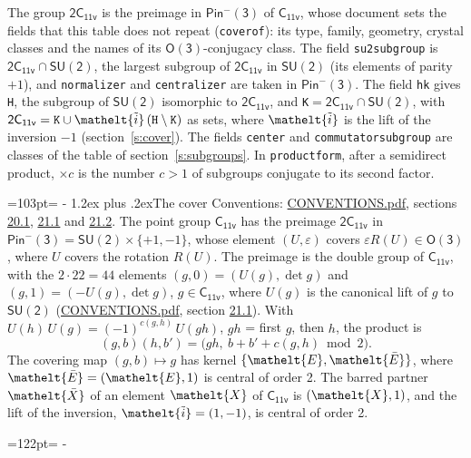 \documentclass[10pt,a4paper]{article}
\makeatletter
\renewcommand\section{\@startsection{section}{1}{\z@}{-3ex plus -1ex minus -.2ex}%
  {1.2ex plus .2ex}{\normalfont\large\sffamily\bfseries\color{parttitle}}}
\newcommand{\needspace}[1]{\par\penalty-100\begingroup\dimen0=#1\relax\dimen2=\pagegoal
  \advance\dimen2-\pagetotal\ifdim\dimen0>\dimen2\relax\ifdim\dimen2>0pt\vfil\break\fi\fi
  \endgroup}
\numberwithin{equation}{section}
\newcommand{\eltfont}[1]{{\let\sigma\eltsigma\mathelt{#1}}}
\newcommand{\grp}[1]{\mathsf{#1}}
\newcommand{\elt}[1]{\eltfont{#1}}
\newcommand{\dirprod}{\times}
\newcommand{\barred}[1]{\bar{#1}}
\newcommand{\lift}[1]{\tilde{#1}}
\makeatother
\begin{document}
\leavevmode\label{n:element.inversion}\label{n:group.preimage}The group $\grp{2C_{11v}}$ is the preimage in $\grp{Pin^{-}(3)}$ of \href{../../../rotation/data/pdf/C11v.pdf}{$\grp{C_{11v}}$}, whose document sets the fields that this table does not repeat (\texttt{coverof}): its type, family, geometry, crystal classes and the names of its \href{../../../rotation/data/pdf/O3.pdf}{$\grp{O(3)}$}-conjugacy class. The field \texttt{su2subgroup} is $\grp{2C_{11v}} \cap \grp{SU(2)}$, the largest subgroup of $\grp{2C_{11v}}$ in $\grp{SU(2)}$ (its elements of parity $+1$), and \texttt{normalizer} and \texttt{centralizer} are taken in $\grp{Pin^{-}(3)}$. The field \texttt{hk} gives \texttt{H}, the subgroup of $\grp{SU(2)}$ isomorphic to $\grp{2C_{11v}}$, and \texttt{K}${} = \grp{2C_{11v}} \cap \grp{SU(2)}$, with $\grp{2C_{11v}} = \texttt{K} \cup \elt{\lift{i}}\,(\texttt{H} \setminus \texttt{K})$ as sets, where $\elt{\lift{i}}$ is the lift of the inversion $-1$ (section~\ref{s:cover}). The fields \texttt{center} and \texttt{commutatorsubgroup} are classes of the table of section~\ref{s:subgroups}.
\leavevmode\label{n:index.conjugates.c}In \texttt{productform}, after a semidirect product, ${\times}c$ is the number $c > 1$ of subgroups conjugate to its second factor.
\needspace{103pt}
\section{The cover}\label{s:cover}
Conventions: \href{../../CONVENTIONS.pdf}{CONVENTIONS.pdf}, sections \href{../../CONVENTIONS.pdf\#conv.20.1}{20.1}, \href{../../CONVENTIONS.pdf\#conv.21.1}{21.1} and \href{../../CONVENTIONS.pdf\#conv.21.2}{21.2}.
\leavevmode\label{n:group.pin.minus}\label{n:group.su2}\label{n:local.pin.sign}\label{n:matrix.covered}\label{n:matrix.lift.su2}\label{n:index.bar}The point group $\grp{C_{11v}}$ has the preimage $\grp{2C_{11v}}$ in $\grp{Pin^{-}(3)} = \grp{SU(2)} \dirprod \{+1, -1\}$, whose element $(U, \varepsilon)$ covers $\varepsilon R(U) \in \grp{O(3)}$, where $U$ covers the rotation $R(U)$. The preimage is the double group of $\grp{C_{11v}}$, with the $2 \cdot 22 = 44$ elements $(g, 0) = (U(g), \det g)$ and $(g, 1) = (-U(g), \det g)$, $g \in \grp{C_{11v}}$, where $U(g)$ is the canonical lift of $g$ to $\grp{SU(2)}$ (\href{../../CONVENTIONS.pdf}{CONVENTIONS.pdf}, section \href{../../CONVENTIONS.pdf\#conv.21.1}{21.1}). \label{n:function.cocycle}With $U(h)\,U(g) = (-1)^{c(g,h)}\,U(gh)$, $gh$ = first $g$, then $h$, the product is
\begin{equation}\label{e:product}(g, b)(h, b') = \bigl(gh,\ b + b' + c(g, h) \bmod 2\bigr).\end{equation}
\leavevmode\label{n:mark.bar}The covering map $(g, b) \mapsto g$ has kernel $\{\elt{E}, \elt{\barred{E}}\}$, where $\elt{\barred{E}} = (\elt{E}, 1)$ is central of order 2. \label{n:element.named}\label{n:mark.lift}The barred partner $\elt{\barred{X}}$ of an element $\elt{X}$ of $\grp{C_{11v}}$ is $(\elt{X}, 1)$, and the lift of the inversion, $\elt{\lift{i}} = (1, -1)$, is central of order 2.
\needspace{122pt}
\end{document}
